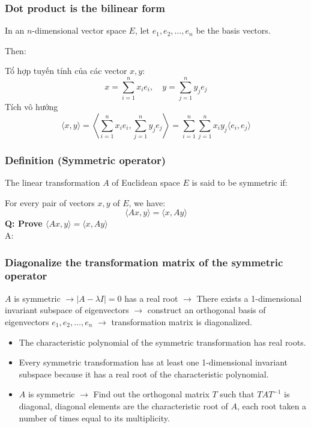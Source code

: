 \subsubsection{Dot product is the bilinear form}

In an $n$-dimensional vector space $E$, let $e_1, e_2, \ldots, e_n$ be the basis vectors.

Then:

Tổ hợp tuyến tính của các vector $x, y$:
\[
x = \sum_{i=1}^n x_i e_i, \quad y = \sum_{j=1}^n y_j e_j
\]
Tích vô hướng
\[
\langle x, y \rangle = \left\langle \sum_{i=1}^n x_i e_i, \sum_{j=1}^n y_j e_j \right\rangle = \sum_{i=1}^n \sum_{j=1}^n x_i y_j \langle e_i, e_j \rangle
\]

\subsubsection{Definition (Symmetric operator)}

The linear transformation $A$ of Euclidean space $E$ is said to be symmetric if:

For every pair of vectors $x, y$ of $E$, we have:
\begin{equation*}
    \langle Ax, y \rangle = \langle x, Ay \rangle
\end{equation*}
\textbf{Q: Prove $\langle Ax, y \rangle = \langle x, Ay \rangle$}\\
A:


\subsubsection{Diagonalize the transformation matrix of the symmetric operator}

$A$ is symmetric $\rightarrow |A - \lambda I| = 0$ has a real root $\rightarrow$ There exists a 1-dimensional invariant subspace of eigenvectors $\rightarrow$ construct an orthogonal basis of eigenvectors $e_1, e_2, \dots, e_n$ $\rightarrow$ transformation matrix is diagonalized.
\begin{itemize}
    \item The characteristic polynomial of the symmetric transformation has real roots.
    \item Every symmetric transformation has at least one 1-dimensional invariant subspace because it has a real root of the characteristic polynomial.
    \item $A$ is symmetric $\rightarrow$ Find out the orthogonal matrix $T$ such that $TAT^{-1}$ is diagonal, diagonal elements are the characteristic root of $A$, each root taken a number of times equal to its multiplicity.
\end{itemize}


